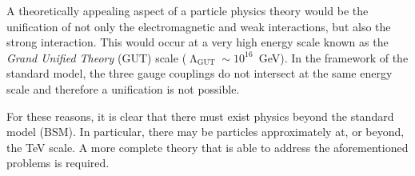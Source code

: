 A theoretically appealing aspect of a particle physics theory would be the 
unification of not only the electromagnetic and weak interactions, but also the 
strong interaction. This would occur at a very high energy scale known as the 
\textit{Grand Unified Theory} (GUT) scale ($\upLambda_{\mathrm{GUT}} \sim 
10^{16}$~GeV). In the framework of the standard model, the three gauge 
couplings do not intersect at the same energy scale and therefore a unification 
is not possible.

For these reasons, it is clear that there must exist physics beyond the 
standard model (BSM). In particular, there may be particles approximately at, 
or beyond, the TeV scale. 
A more complete theory that is able to address the aforementioned 
problems is required.

